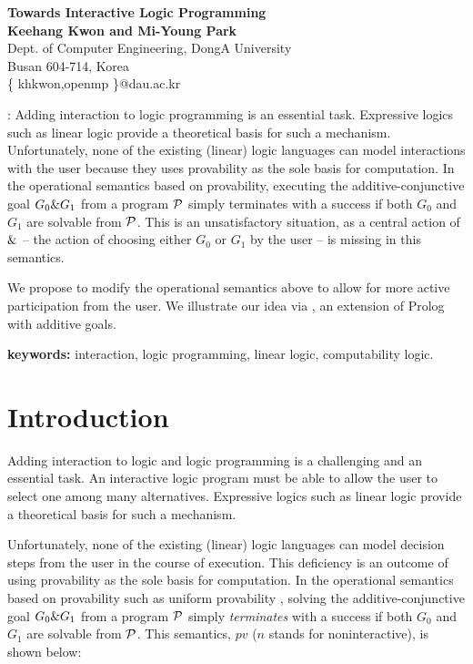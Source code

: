 \documentclass[12pt]{article}
\newcommand{\Pscr}{{\cal P}}
\newcommand{\pr}{prov}
\renewcommand{\pr}{pv}
\begin{document}
\begin{center}
{\Large {\bf Towards Interactive Logic Programming}}
\\[20pt] 
{\bf Keehang Kwon and Mi-Young Park}\\
Dept. of Computer  Engineering, DongA University \\
Busan 604-714, Korea\\
\{ khkwon,openmp \}@dau.ac.kr\\
\end{center}

: 
Adding interaction to  logic programming is an essential task. 
 Expressive logics such as linear logic provide a theoretical basis for such a
 mechanism.
 Unfortunately, none of the existing (linear) logic languages can model interactions with the user because
they uses provability as the sole basis for computation.
In the operational semantics based on  provability, 
executing the additive-conjunctive goal $G_0 \& G_1$ from a program $\Pscr$ 
simply terminates with a success if both $G_0$ and $G_1$ are solvable from $\Pscr$.
This is an unsatisfactory situation, as  a central action of $\&$ -- 
the action of  choosing either $G_0$ or $G_1$ by the
user -- is missing in this  semantics.


   We propose to modify the  operational
semantics above to allow for more active participation from the user. We illustrate our idea
via \muprolog, an extension of Prolog with additive goals.


{\bf keywords:} interaction, logic programming, linear logic, computability logic.














\section{Introduction}\label{sec:intro}

Adding interaction to logic and logic programming is a challenging and an essential task. An interactive logic 
program must be able to allow
the user to select one among many alternatives. Expressive logics such as linear logic provide a theoretical basis for such a
 mechanism.

Unfortunately, none of the existing (linear) logic languages can model decision steps from the user in the course of execution.
 This deficiency is an outcome of
using  provability as the sole basis for computation.
In the operational semantics based on  provability such as  uniform provability 
\cite{HM94,Mil89jlp,MNPS91}, 
solving the additive-conjunctive goal $G_0 \& G_1$ from a program $\Pscr$
 simply {\it terminates} with a success if both $G_0$ and $G_1$ are solvable from $\Pscr$.
This  semantics, $\pr$ ($n$ stands for noninteractive), is shown below:
\end{document}
